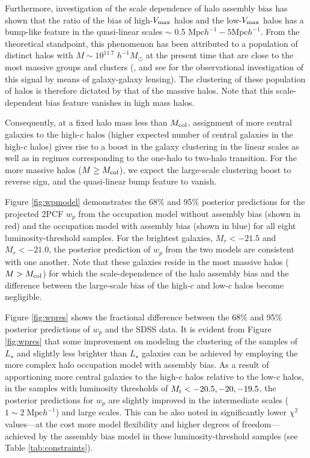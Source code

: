 \documentclass[twocolumn]{aastex61}
\begin{document}
Furthermore, investigation of the scale dependence of halo assembly bias has shown that the ratio of the bias of high-$V_{\rm max}$ halos and the low-$V_{\rm max}$ halos has a bump-like feature in the quasi-linear scales $\sim$ 0.5 $\mathrm{Mpc}h^{-1}-5\mathrm{Mpc}h^{-1}$. From the theoretical standpoint, this phenomenon has been attributed to a population of distinct halos with $M \sim 10^{11.7} \; h^{-1}M_{\odot}$ at the present time that are close to the most massive groups and clusters (\citealt{sunayama2016}, and see \citealt{more2016} for the observational investigation of this signal by means of galaxy-galaxy lensing). The clustering of these population of halos is therefore dictated by that of the massive halos. Note that this scale-dependent bias feature vanishes in high mass halos. 

Consequently, at a fixed halo mass less than $M_{\rm col}$, assignment of more central galaxies to the high-$c$ halos (higher expected number of central galaxies in the high-$c$ halos) gives rise to a boost in the galaxy clustering in the linear scales as well as in regimes corresponding to the one-halo to two-halo transition. For the more massive halos ($M \geq M_{\rm col}$), we expect the large-scale clustering boost to reverse sign, and the quasi-linear bump feature to vanish.  

Figure \ref{fig:wpmodel} demonstrates the 68$\%$ and 95$\%$ posterior predictions for the projected 2PCF $w_{p}$ from the occupation model without assembly bias (shown in red) and the occupation model with assembly bias (shown in blue) for all eight luminosity-threshold samples. For the brightest galaxies, $M_{r} < -21.5$ and $M_{r} < -21.0$, the posterior prediction of $w_{p}$ from the two models are consistent with one another. Note that these galaxies reside in the most massive halos ($M > M_{\rm col}$) for which the scale-dependence of the halo assembly bias and the difference between the large-scale bias of the high-$c$ and low-$c$ halos become negligible. 

Figure \ref{fig:wpres} shows the fractional difference between the 68$\%$ and 95$\%$ posterior predictions of $w_p$ and the SDSS data. It is evident from Figure \ref{fig:wpres} that some improvement on modeling the clustering of the samples of $L_{\star}$ and slightly less brighter than $L_{\star}$ galaxies can be achieved by employing the more complex halo occupation model with assembly bias. As a result of apportioning more central galaxies to the high-$c$ halos relative to the low-$c$ halos, in the samples with luminosity thresholds of $M_{\rm r}<-20.5, -20, -19.5$, the posterior predictions for $w_{p}$ are slightly improved in the intermediate scales ($1\sim 2 \; \mathrm{Mpc} h^{-1}$) and large scales. This can be also noted in significantly lower $\chi^{2}$ values---at the cost more model flexibility and higher degrees of freedom---achieved by the assembly bias model in these luminosity-threshold samples (see Table \ref{tab:constraints}).  
\end{document}
